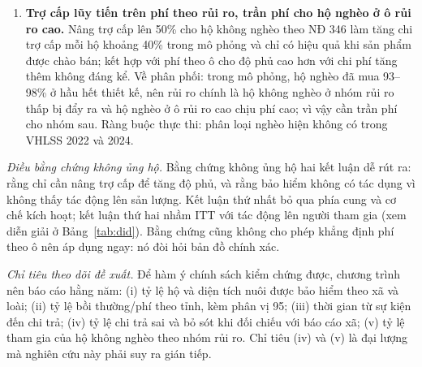 \documentclass[12pt,a4paper]{article}
\begin{document}
\begin{enumerate}
\item \textbf{Trợ cấp lũy tiến trên phí theo rủi ro, trần phí cho hộ nghèo ở ô rủi ro cao.} Nâng trợ cấp lên 50\% cho hộ không nghèo theo NĐ 346 làm tăng chi trợ cấp mỗi hộ khoảng 40\% trong mô phỏng và chỉ có hiệu quả khi sản phẩm được chào bán; kết hợp với phí theo ô cho độ phủ cao hơn với chi phí tăng thêm không đáng kể. Về phân phối: trong mô phỏng, hộ nghèo đã mua 93--98\% ở hầu hết thiết kế, nên rủi ro chính là hộ không nghèo ở nhóm rủi ro thấp bị đẩy ra và hộ nghèo ở ô rủi ro cao chịu phí cao; vì vậy cần trần phí cho nhóm sau. Ràng buộc thực thi: phân loại nghèo hiện không có trong VHLSS 2022 và 2024.
\end{enumerate}

\textit{Điều bằng chứng không ủng hộ.} Bằng chứng không ủng hộ hai kết luận dễ rút ra: rằng chỉ cần nâng trợ cấp để tăng độ phủ, và rằng bảo hiểm không có tác dụng vì không thấy tác động lên sản lượng. Kết luận thứ nhất bỏ qua phía cung và cơ chế kích hoạt; kết luận thứ hai nhầm ITT với tác động lên người tham gia (xem diễn giải ở Bảng~\ref{tab:did}). Bằng chứng cũng không cho phép khẳng định phí theo ô nên áp dụng ngay: nó đòi hỏi bản đồ chính xác.

\textit{Chỉ tiêu theo dõi đề xuất.} Để hàm ý chính sách kiểm chứng được, chương trình nên báo cáo hằng năm: (i) tỷ lệ hộ và diện tích nuôi được bảo hiểm theo xã và loài; (ii) tỷ lệ bồi thường/phí theo tỉnh, kèm phân vị 95; (iii) thời gian từ sự kiện đến chi trả; (iv) tỷ lệ chi trả sai và bỏ sót khi đối chiếu với báo cáo xã; (v) tỷ lệ tham gia của hộ không nghèo theo nhóm rủi ro. Chỉ tiêu (iv) và (v) là đại lượng mà nghiên cứu này phải suy ra gián tiếp.
\end{document}
